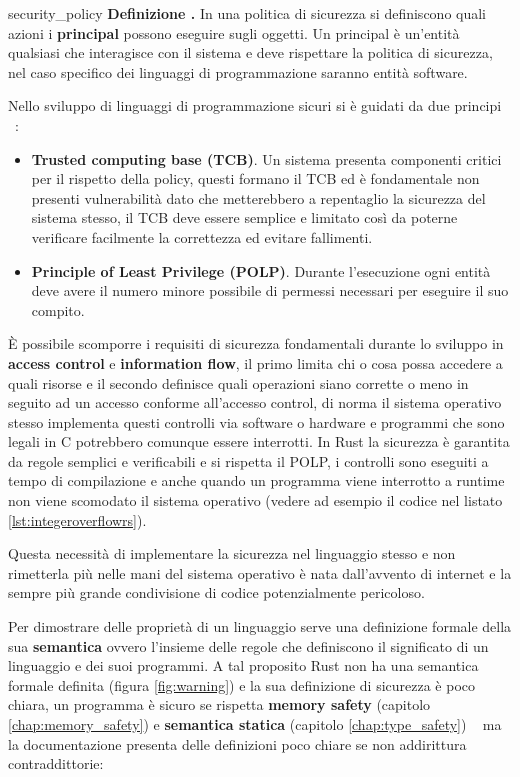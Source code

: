 \documentclass[Lau,binding=0.6cm]{sapthesis}
\newenvironment{myDefinition}[2]{ \begin{Definizione}[adjusted title=#1]{}{#2}
    \textbf{Definizione \thetcbcounter.} }{\end{Definizione}}
\begin{document}
\begin{myDefinition}{Security policy}{security_policy}
    In una politica di sicurezza si definiscono quali azioni i \textbf{principal} possono eseguire sugli oggetti. Un principal è un'entità qualsiasi che interagisce con il sistema e deve rispettare la politica di sicurezza, nel caso specifico dei linguaggi di programmazione saranno entità software.
\end{myDefinition}

Nello sviluppo di linguaggi di programmazione sicuri si è guidati da due principi ~\cite{nino:security_programming_language}:
\begin{itemize}
    \item \textbf{Trusted computing base (TCB)}. Un sistema presenta componenti critici per il rispetto della policy, questi formano il TCB ed è fondamentale non presenti vulnerabilità dato che metterebbero a repentaglio la sicurezza del sistema stesso, il TCB deve essere semplice e limitato così da poterne verificare facilmente la correttezza ed evitare fallimenti. 
    \item \textbf{Principle of Least Privilege (POLP)}. Durante l'esecuzione ogni entità deve avere il numero minore possibile di permessi necessari per eseguire il suo compito. 
\end{itemize} 
È possibile scomporre i requisiti di sicurezza fondamentali durante lo sviluppo in \textbf{access control} e \textbf{information flow}, il primo limita chi o cosa possa accedere a quali risorse e il secondo definisce quali operazioni siano corrette o meno in seguito ad un accesso conforme all'accesso control, di norma il sistema operativo stesso implementa questi controlli via software o hardware e programmi che sono legali in C potrebbero comunque essere interrotti. 
In Rust la sicurezza è garantita da regole semplici e verificabili e si rispetta il POLP, i controlli sono eseguiti a tempo di compilazione e anche quando un programma viene interrotto a runtime non viene scomodato il sistema operativo (vedere ad esempio il codice nel listato \ref{lst:integeroverflowrs}).

Questa necessità di implementare la sicurezza nel linguaggio stesso e non rimetterla più nelle mani del sistema operativo è nata dall'avvento di internet e la sempre più grande condivisione di codice potenzialmente pericoloso.

Per dimostrare delle proprietà di un linguaggio serve una definizione formale della sua \textbf{semantica} ovvero l'insieme delle regole che definiscono il significato di un linguaggio e dei suoi programmi.
A tal proposito Rust non ha una semantica formale definita (figura \ref{fig:warning}) e la sua definizione di sicurezza è poco chiara, un programma è sicuro se rispetta \textbf{memory safety} (capitolo \ref{chap:memory_safety}) e \textbf{semantica statica} (capitolo \ref{chap:type_safety}) ~\cite[14]{rust:reference} ma la documentazione presenta delle definizioni poco chiare se non addirittura contraddittorie: 
\end{document}
